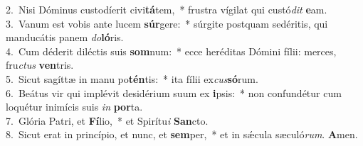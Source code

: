 {2.~}Nisi Dóminus custodíerit civi\textbf{tá}tem,~* frustra vígilat qui custó\textit{dit} \textbf{e}am.\\
{3.~}Vanum est vobis ante lucem \textbf{súr}gere:~* súrgite postquam sedéritis, qui manducátis panem \textit{do}\textbf{ló}ris.\\
{4.~}Cum déderit diléctis suis \textbf{som}num:~* ecce heréditas Dómini fílii: merces, fru\textit{ctus} \textbf{ven}tris.\\
{5.~}Sicut sagíttæ in manu po\textbf{tén}tis:~* ita fílii ex\textit{cus}\textbf{só}rum.\\
{6.~}Beátus vir qui implévit desidérium suum ex \textbf{i}psis:~* non confundétur cum loquétur inimícis suis \textit{in} \textbf{por}ta.\\
{7.~}Glória Patri, et \textbf{Fí}lio,~* et Spirítu\textit{i} \textbf{San}cto.\\
{8.~}Sicut erat in princípio, et nunc, et \textbf{sem}per,~* et in sǽcula sæculó\textit{rum}. \textbf{A}men.\\
